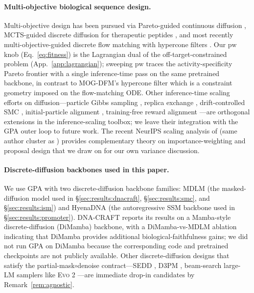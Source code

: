 \documentclass{article}
\theoremstyle{definition}
\theoremstyle{remark}
\newcommand{\gpa}{\textsc{GPA}\xspace}
\newcommand{\evo}{\textsc{Evo 2}\xspace}
\newcommand{\dnacraft}{\textsc{DNA-CRAFT}\xspace}
\begin{document}
\paragraph{Multi-objective biological sequence design.}
Multi-objective design has been pursued via Pareto-guided continuous diffusion \citep{yao2024proud}, MCTS-guided discrete diffusion for therapeutic peptides \citep{tang2024peptune}, and most recently multi-objective-guided discrete flow matching with hypercone filters \citep{tang2025mogdfm}. Our $\mathrm{pw}$ knob (Eq.~\ref{eq:fitness}) is the Lagrangian dual of the off-target-constrained problem (App.~\ref{app:lagrangian}); sweeping $\mathrm{pw}$ traces the activity-specificity Pareto frontier with a single inference-time pass on the same pretrained backbone, in contrast to MOG-DFM's hypercone filter which is a constraint geometry imposed on the flow-matching ODE. Other inference-time scaling efforts on diffusion---particle Gibbs sampling \citep{dang2025particlegibbs}, replica exchange \citep{he2025crepe}, drift-controlled SMC \citep{lee2025driftlite}, initial-particle alignment \citep{park2025psisampler}, training-free reward alignment \citep{kim2025das}---are orthogonal extensions in the inference-scaling toolbox; we leave their integration with the GPA outer loop to future work. The recent NeurIPS scaling analysis of \citet{ouli2025isidd} (same author cluster as \citealt{paniouli2025}) provides complementary theory on importance-weighting and proposal design that we draw on for our own variance discussion.

\paragraph{Discrete-diffusion backbones used in this paper.}
We use \gpa{} with two discrete-diffusion backbone families: MDLM \citep{sahoo2024mdlm} (the masked-diffusion model used in \S\ref{sec:results:dnacraft}, \S\ref{sec:results:smc}, and \S\ref{sec:results:ism}) and HyenaDNA \citep{hyenadna2023} (the autoregressive SSM backbone used in \S\ref{sec:results:promoter}). \dnacraft{} \citep{dnacraft2026} reports its results on a Mamba-style discrete-diffusion (DiMamba) backbone, with a DiMamba-vs-MDLM ablation indicating that DiMamba provides additional biological-faithfulness gains; we did not run \gpa{} on DiMamba because the corresponding code and pretrained checkpoints are not publicly available. Other discrete-diffusion designs that satisfy the partial-mask$\circ$denoise contract---SEDD \citep{lou2024sedd}, D3PM \citep{austin2021d3pm}, beam-search large-LM samplers like \evo{} \citep{evo2024}---are immediate drop-in candidates by Remark~\ref{rem:agnostic}.
\end{document}
